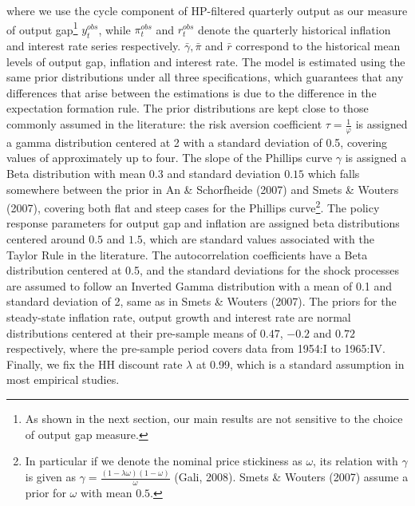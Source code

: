 where we use the cycle component of HP-filtered quarterly output as our measure of output gap\footnote{As shown in the next section, our main results are not sensitive to the choice of output gap measure.} ${y_t^{obs}}$, while $ \pi_t^{obs} $ and $r_t^{obs} $ denote the quarterly historical inflation and interest rate series respectively. $\bar{\gamma}, \bar{\pi} $ and $ \bar{r}$ correspond to the historical mean levels of output gap, inflation and interest rate. The model is estimated using the same prior distributions under all three specifications, which guarantees that any differences that arise between the estimations is due to the difference in the expectation formation rule. The prior distributions are kept close to those commonly assumed in the literature: the risk aversion coefficient $\tau= \frac{1}{\varphi}$ is assigned a gamma distribution centered at 2 with a standard deviation of 0.5, covering values of approximately up to four. The slope of the Phillips curve $ \gamma$ is assigned a Beta distribution with mean $ 0.3$ and standard deviation $0.15$  which falls somewhere between the prior in An \& Schorfheide (2007) and Smets \& Wouters (2007), covering both flat and steep cases for the Phillips curve\footnote{In particular if we denote the nominal price stickiness as $\omega$, its relation with $\gamma$ is given as $\gamma=\frac{(1-\lambda \omega)(1-\omega)}{\omega}$ (Gali, 2008). Smets \& Wouters (2007) assume a prior for $\omega$ with mean $0.5$.}.  The policy response parameters for output gap and inflation are assigned beta distributions centered around $ 0.5$ and $ 1.5$, which are standard values associated with the Taylor Rule in the literature. The autocorrelation coefficients have a Beta distribution centered at 0.5, and the standard deviations for the shock processes are assumed to follow an Inverted Gamma distribution with a mean of 0.1 and standard deviation of 2, same as in Smets \& Wouters (2007). The priors for the steady-state inflation rate, output growth and interest rate are normal distributions centered at their pre-sample means of $0.47$, $-0.2$ and $0.72$ respectively, where the pre-sample period covers data from 1954:I to 1965:IV.  Finally, we fix the HH discount rate $\lambda$ at 0.99, which is a standard assumption in most empirical studies.\\




